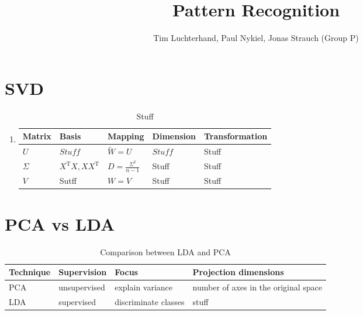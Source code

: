 \documentclass[DIN, pagenumber=false, fontsize=11pt, parskip=half]{scrartcl}
\title{Pattern Recognition}
\author{Tim Luchterhand, Paul Nykiel, Jonas Strauch (Group P)}
\begin{document}
    \maketitle
    \section{SVD}
    \begin{enumerate}
        \item
            \begin{table}[H]
                \centering
                \begin{tabularx}{\textwidth}{lllll}
                    \toprule
                    Matrix & Basis & Mapping & Dimension & Transformation \\
                    \midrule
                    $U$ & $Stuff$ & $\widetilde{W} = U$ & $Stuff$ & Stuff \\
                    $\Sigma $ & $X^\text{T}X, XX^\text{T}$ & $D = \frac{\Sigma^2}{n-1}$ & Stuff & Stuff \\
                    $V$ & Sutff & $W = V$ & Stuff & Stuff \\
                    \bottomrule
                \end{tabularx}
                \caption{Stuff}
            \end{table}
    \end{enumerate}
    \section{PCA vs LDA}
    \begin{table}[H]
        \centering
        \begin{tabularx}{\textwidth}{llll}
            \toprule
            Technique & Supervision & Focus & Projection dimensions \\
            \midrule
            PCA & unsupervised & explain variance & number of axes in the original space\\
            LDA & supervised & discriminate classes & stuff \\
            \bottomrule
        \end{tabularx}
        \caption{Comparison between LDA and PCA}
    \end{table}
\end{document}
